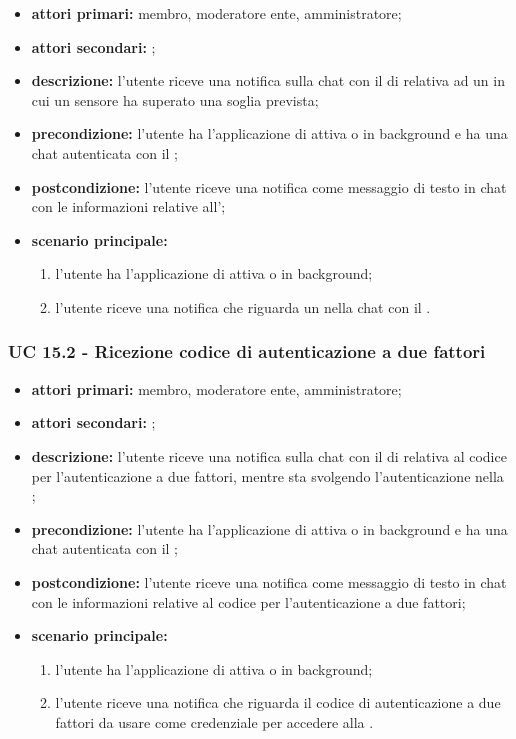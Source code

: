 	\begin{itemize}
		\item \textbf{attori primari:} membro, moderatore ente, amministratore;
		\item \textbf{attori secondari:} ;
		\item \textbf{descrizione:} l'utente riceve una notifica sulla chat con il  di  relativa ad un  in cui un sensore ha superato una soglia prevista;
		\item \textbf{precondizione:} l'utente ha l'applicazione di  attiva o in background e ha una chat autenticata con il ;
		\item \textbf{postcondizione:} l'utente riceve una notifica come messaggio di testo in chat con le informazioni relative all';
		\item \textbf{scenario principale:}
		\begin{enumerate}
			\item l'utente ha l'applicazione di  attiva o in background;
			\item l'utente riceve una notifica che riguarda un  nella chat con il .
		\end{enumerate}
	\end{itemize}

	\subsubsection{UC 15.2 - Ricezione codice di autenticazione a due fattori}

	\begin{itemize}
		\item \textbf{attori primari:} membro, moderatore ente, amministratore;
		\item \textbf{attori secondari:} ;
		\item \textbf{descrizione:} l'utente riceve una notifica sulla chat con il  di  relativa al codice per l'autenticazione a due fattori, mentre sta svolgendo l'autenticazione nella ;
		\item \textbf{precondizione:} l'utente ha l'applicazione di  attiva o in background e ha una chat autenticata con il ;
		\item \textbf{postcondizione:} l'utente riceve una notifica come messaggio di testo in chat con le informazioni relative al codice per l'autenticazione a due fattori;
		\item \textbf{scenario principale:}
		\begin{enumerate}
			\item l'utente ha l'applicazione di  attiva o in background;
			\item l'utente riceve una notifica che riguarda il codice di autenticazione a due fattori da usare come credenziale per accedere alla .
		\end{enumerate}
	\end{itemize}
